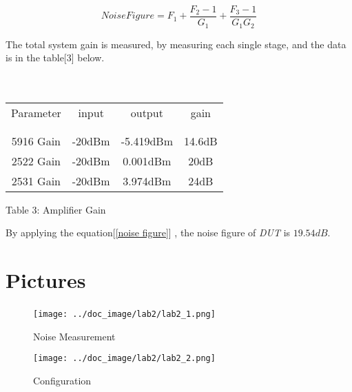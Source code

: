 \documentclass[]{article}
\begin{document}
\begin{equation}
    Noise Figure = F_{1} + \frac{F_{2} - 1}{G_{1}} + \frac{F_{3} - 1}{G_{1}G_{2}}
    \label{cascading amplifiers}
\end{equation}

The total system gain is measured, by measuring each single stage, and the data is 
in the table[3] below. \\ \\ \\

\begin{center}
    \begin{tabular}{c c c c}
        Parameter & input & output & gain\\ \\ \hline \\
        5916 Gain  & -20dBm & -5.419dBm & 14.6dB\\
        2522 Gain  & -20dBm & 0.001dBm & 20dB\\
        2531 Gain  & -20dBm & 3.974dBm & 24dB
    \end{tabular}
\end{center}

\begin{center}
    Table 3: Amplifier Gain
\end{center}

By applying the equation[\ref{noise figure}] , the noise figure of \textit{DUT} is $19.54dB$.

\section{Pictures}

\begin{figure}[p]
    \begin{center}
            \texttt{[image: ../doc\_image/lab2/lab2\_1.png]}~
            \caption{Noise Measurement}
    \end{center}
\end{figure}

\begin{figure}[p]
    \begin{center}
            \texttt{[image: ../doc\_image/lab2/lab2\_2.png]}
            \caption{Configuration}
    \end{center}
\end{figure}
\end{document}
